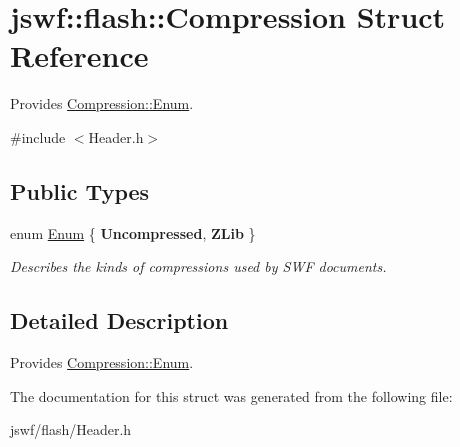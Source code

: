 \hypertarget{structjswf_1_1flash_1_1_compression}{\section{jswf\+:\+:flash\+:\+:Compression Struct Reference}
\label{structjswf_1_1flash_1_1_compression}
}


Provides \hyperlink{structjswf_1_1flash_1_1_compression_a393e4fe7bb01f081e0c1d1d009c22c2a}{Compression\+::\+Enum}.  




{\ttfamily \#include $<$Header.\+h$>$}

\subsection*{Public Types}
\begin{DoxyCompactItemize}
\item 
\hypertarget{structjswf_1_1flash_1_1_compression_a393e4fe7bb01f081e0c1d1d009c22c2a}{enum \hyperlink{structjswf_1_1flash_1_1_compression_a393e4fe7bb01f081e0c1d1d009c22c2a}{Enum} \{ {\bfseries Uncompressed}, 
{\bfseries Z\+Lib}
 \}}\label{structjswf_1_1flash_1_1_compression_a393e4fe7bb01f081e0c1d1d009c22c2a}

\begin{DoxyCompactList}\small\item\em Describes the kinds of compressions used by S\+W\+F documents. \end{DoxyCompactList}\end{DoxyCompactItemize}


\subsection{Detailed Description}
Provides \hyperlink{structjswf_1_1flash_1_1_compression_a393e4fe7bb01f081e0c1d1d009c22c2a}{Compression\+::\+Enum}. 

The documentation for this struct was generated from the following file\+:\begin{DoxyCompactItemize}
\item 
jswf/flash/Header.\+h\end{DoxyCompactItemize}
